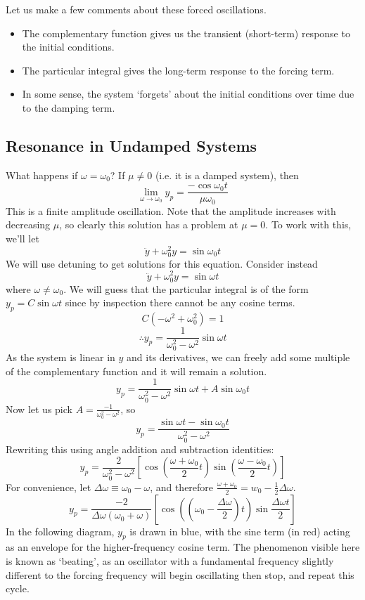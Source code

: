 \documentclass{article}
\begin{document}
\noindent Let us make a few comments about these forced oscillations.
\begin{itemize}
	\item The complementary function gives us the transient (short-term) response to the initial conditions.
	\item The particular integral gives the long-term response to the forcing term.
	\item In some sense, the system `forgets' about the initial conditions over time due to the damping term.
\end{itemize}

\subsection{Resonance in Undamped Systems}
What happens if $\omega = \omega_0$? If $\mu \neq 0$ (i.e. it is a damped system), then
\[ \lim_{\omega \to \omega_0} y_p = \frac{-\cos\omega_0 t}{\mu\omega_0} \]
This is a finite amplitude oscillation. Note that the amplitude increases with decreasing $\mu$, so clearly this solution has a problem at $\mu = 0$. To work with this, we'll let
\[ \ddot y + \omega_0^2 y = \sin\omega_0 t \]
We will use detuning to get solutions for this equation. Consider instead
\[ \ddot y + \omega_0^2 y = \sin\omega t \]
where $\omega \neq \omega_0$. We will guess that the particular integral is of the form $y_p = C\sin\omega t$ since by inspection there cannot be any cosine terms.
\[ C(-\omega^2 + \omega_0^2) = 1 \]
\[ \therefore y_p = \frac{1}{\omega_0^2 - \omega^2}\sin\omega t \]
As the system is linear in $y$ and its derivatives, we can freely add some multiple of the complementary function and it will remain a solution.
\[ y_p = \frac{1}{\omega_0^2 - \omega^2}\sin\omega t + A \sin\omega_0 t \]
Now let us pick $A = \frac{-1}{\omega_0^2 - \omega^2}$, so
\[ y_p = \frac{\sin \omega t - \sin \omega_0 t}{\omega_0^2 - \omega^2} \]
Rewriting this using angle addition and subtraction identities:
\[ y_p = \frac{2}{\omega_0^2 - \omega^2}\left[ \cos\left( \frac{\omega + \omega_0}{2}t \right) \sin\left( \frac{\omega - \omega_0}{2}t \right) \right] \]
For convenience, let $\Delta\omega \equiv \omega_0 - \omega$, and therefore $\frac{\omega + \omega_0}{2} = w_0 - \frac{1}{2}\Delta\omega$.
\[ y_p = \frac{-2}{\Delta\omega(\omega_0 + \omega)}\left[ \cos\left( \left(\omega_0 - \frac{\Delta\omega}{2}\right)t \right) \sin\frac{\Delta\omega t}{2} \right] \]
In the following diagram, $y_p$ is drawn in blue, with the sine term (in red) acting as an envelope for the higher-frequency cosine term. The phenomenon visible here is known as `beating', as an oscillator with a fundamental frequency slightly different to the forcing frequency will begin oscillating then stop, and repeat this cycle.\medskip
\end{document}
